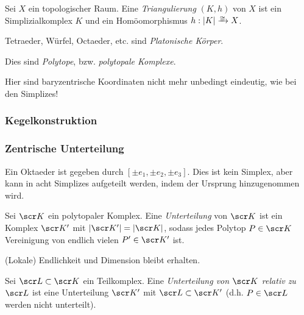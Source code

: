 \begin{df}
	Sei $X$ ein topologischer Raum.
	Eine \emph{Triangulierung} $(K, h)$ von $X$ ist ein Simplizialkomplex $K$ und ein Homöomorphismus $h: |K| \homto X$.
\end{df}


\begin{ex}

	Tetraeder, Würfel, Octaeder, etc. sind \emph{Platonische Körper}.

	Dies sind \emph{Polytope}, bzw. \emph{polytopale Komplexe}.

	Hier sind baryzentrische Koordinaten nicht mehr unbedingt eindeutig, wie bei den Simplizes!
\end{ex}

\subsubsection{Kegelkonstruktion}


\subsubsection{Zentrische Unterteilung}



Ein Oktaeder ist gegeben durch $[\pm e_1, \pm e_2, \pm e_3]$.
Dies ist kein Simplex, aber kann in acht Simplizes aufgeteilt werden, indem der Ursprung hinzugenommen wird.

\begin{df}
	Sei $\scr K$ ein polytopaler Komplex.
	Eine \emph{Unterteilung} von $\scr K$ ist ein Komplex $\scr K'$ mit $|\scr K'| = |\scr K|$, sodass jedes Polytop $P \in \scr K$ Vereinigung von endlich vielen $P' \in \scr K'$ ist.
	\begin{note}
		(Lokale) Endlichkeit und Dimension bleibt erhalten.
	\end{note}
\end{df}

\begin{df}
	Sei $\scr L \subset \scr K$ ein Teilkomplex.
	Eine \emph{Unterteilung von $\scr K$ relativ zu $\scr L$} ist eine Unterteilung $\scr K'$ mit $\scr L \subset \scr K'$ (d.h. $P \in \scr L$ werden nicht unterteilt).
\end{df}

